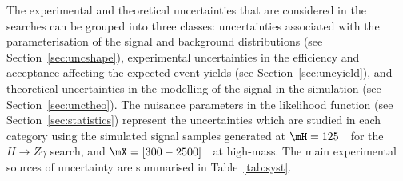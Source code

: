 The experimental and theoretical uncertainties that are considered in the searches can be 
grouped into three classes:
uncertainties associated with the parameterisation of the signal and background distributions
(see Section~\ref{sec:uncshape}), experimental uncertainties in the efficiency and acceptance affecting
the expected event yields (see Section~\ref{sec:uncyield}), and theoretical uncertainties in the 
modelling of
the signal in the simulation (see Section~\ref{sec:unctheo}). The nuisance parameters in the likelihood 
function (see Section~\ref{sec:statistics}) represent the uncertainties which
are studied in each category using the simulated signal samples generated at $\mH =125$~\GeV\ for the 
$H\to Z\gamma$ search, and 
$\mX = [300-2500]$~\GeV\ at high-mass.
The main experimental sources of uncertainty are summarised in Table~\ref{tab:syst}.


